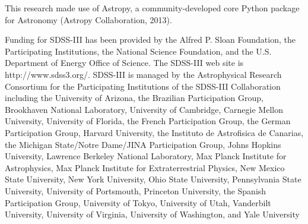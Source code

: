 \documentclass[5p]{elsarticle}
\begin{document}
This research made use of Astropy, a community-developed core Python package for Astronomy (Astropy Collaboration, 2013).

Funding for SDSS-III has been provided by the Alfred P. Sloan Foundation, the Participating Institutions, the National Science Foundation, and the U.S. Department of Energy Office of Science. The SDSS-III web site is http://www.sdss3.org/. SDSS-III is managed by the Astrophysical Research Consortium for the Participating Institutions of the SDSS-III Collaboration including the University of Arizona, the Brazilian Participation Group, Brookhaven National Laboratory, University of Cambridge, Carnegie Mellon University, University of Florida, the French Participation Group, the German Participation Group, Harvard University, the Instituto de Astrofisica de Canarias, the Michigan State/Notre Dame/JINA Participation Group, Johns Hopkins University, Lawrence Berkeley National Laboratory, Max Planck Institute for Astrophysics, Max Planck Institute for Extraterrestrial Physics, New Mexico State University, New York University, Ohio State University, Pennsylvania State University, University of Portsmouth, Princeton University, the Spanish Participation Group, University of Tokyo, University of Utah, Vanderbilt University, University of Virginia, University of Washington, and Yale University


 
\end{document}

